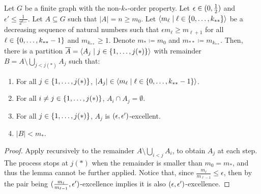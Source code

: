         \begin{lemma} \label{lem:existance_of_excellent_partition}
            Let $G$ be a finite graph with the non-$k_{*}$-order property.
            Let $\epsilon \in ( 0, \frac{1}{2} )$ and $\epsilon' \leq \frac{1}{2^{k_{**}}}$.
            Let $A \subseteq G$ such that $|A| = n \geq m_0$.
            Let $\left< m_\ell \mid \ell \in \{ 0, \dots, k_{**} \} \right>$ be a decreasing sequence of natural numbers such that
            $\epsilon m_{\ell} \geq m_{\ell+1}$ for all $\ell \in \{ 0, \dots, k_{**}-1 \}$ and $m_{k_{**}} \geq 1$.
            Denote $m_* \coloneqq m_0$ and $m_{**} \coloneqq m_{k_{**}}$.
            Then, there is a partition $\overline{A} = \left< A_j \mid j \in \{ 1, \dots, j(*) \} \right>$ with remainder
            $B = A \setminus \bigcup_{j < j(*)} A_j$ such that:
            \begin{enumerate}[label=(\alph*), ref=\alph*]
                \item \label{itm:existance_of_excellent_partition.a} For all $j \in \{ 1, \dots, j(*) \}$, $|A_j| \in \left< m_\ell \mid \ell \in \{ 0, \dots, k_{**}-1 \} \right>$.
                \item \label{itm:existance_of_excellent_partition.b} For all $i \neq j \in \{ 1, \dots, j(*) \}$, $A_i \cap A_j = \emptyset$.
                \item \label{itm:existance_of_excellent_partition.c} For all $j \in \{ 1, \dots, j(*) \}$, $A_j$ is $( \epsilon, \epsilon' )$-excellent.
                \item \label{itm:existance_of_excellent_partition.d} $|B| < m_*$.
            \end{enumerate}
            \begin{proof}
                Apply  recursively to the remainder
                $A \setminus \bigcup_{i < j} A_i$, to obtain $A_j$ at each step.
                The process stops at $j(*)$ when the remainder is smaller than $m_0 = m_*$, and thus
                the lemma cannot be further applied.
                Notice that, since $\frac{m_\ell}{m_{\ell-1}} \leq \epsilon$, then by 
                the pair being $( \frac{m_\ell}{m_{\ell-1}}, \epsilon' )$-excellence
                implies it is also $( \epsilon, \epsilon' )$-excellence.
            \end{proof}
        \end{lemma}

